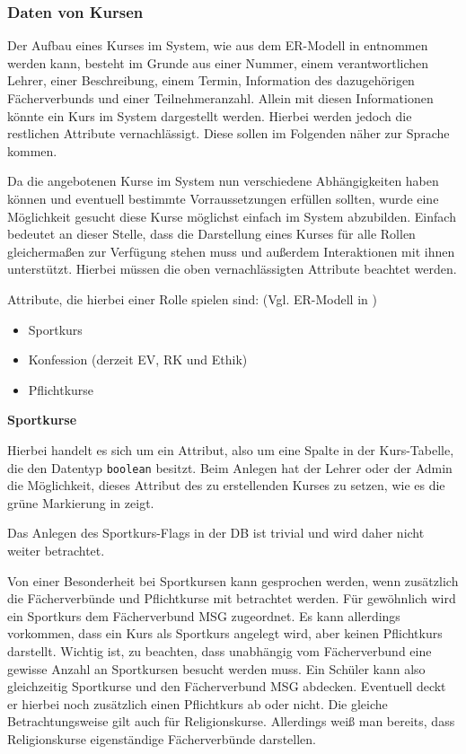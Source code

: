 \subsubsection{Daten von Kursen}

Der Aufbau eines Kurses im System, wie aus dem ER-Modell in  entnommen werden kann, besteht im Grunde aus einer Nummer, einem verantwortlichen Lehrer, einer Beschreibung, einem Termin, Information des dazugehörigen Fächerverbunds  und einer Teilnehmeranzahl. Allein mit diesen Informationen könnte ein Kurs im System dargestellt werden. Hierbei werden jedoch die restlichen Attribute vernachlässigt. Diese sollen im Folgenden näher zur Sprache kommen.  

Da die angebotenen Kurse im System nun verschiedene Abhängigkeiten haben können und eventuell bestimmte Vorraussetzungen erfüllen sollten, wurde eine Möglichkeit gesucht diese Kurse möglichst einfach im System abzubilden. 
Einfach bedeutet an dieser Stelle, dass die Darstellung eines Kurses für alle Rollen gleichermaßen zur Verfügung stehen muss und außerdem Interaktionen mit ihnen unterstützt.
Hierbei müssen die oben vernachlässigten Attribute beachtet werden. 

Attribute, die hierbei einer Rolle spielen sind: (Vgl. ER-Modell in )
\begin{itemize}
  \item Sportkurs
  \item Konfession (derzeit EV, RK und Ethik)
  \item Pflichtkurse
\end{itemize}

\textbf{Sportkurse}

Hierbei handelt es sich um ein Attribut, also um eine Spalte in der Kurs-Tabelle, die den Datentyp \texttt{boolean} besitzt.
Beim Anlegen hat der Lehrer oder der Admin die Möglichkeit, dieses Attribut des zu erstellenden Kurses zu setzen, wie es die grüne Markierung in  zeigt.

Das Anlegen des Sportkurs-Flags in der DB ist trivial und wird daher nicht weiter betrachtet.

Von einer Besonderheit bei Sportkursen kann gesprochen werden, wenn zusätzlich die Fächerverbünde und Pflichtkurse mit betrachtet werden.
Für gewöhnlich wird ein Sportkurs dem Fächerverbund \ac{MSG} zugeordnet. Es kann allerdings vorkommen, dass ein Kurs als Sportkurs angelegt wird, aber keinen Pflichtkurs darstellt.  
Wichtig ist, zu beachten, dass unabhängig vom Fächerverbund eine gewisse Anzahl an Sportkursen besucht werden muss. Ein Schüler kann also gleichzeitig Sportkurse und den Fächerverbund \ac{MSG} abdecken. Eventuell deckt er hierbei noch zusätzlich einen Pflichtkurs ab oder nicht.
Die gleiche Betrachtungsweise gilt auch für Religionskurse. Allerdings weiß man bereits, dass Religionskurse eigenständige Fächerverbünde darstellen.

